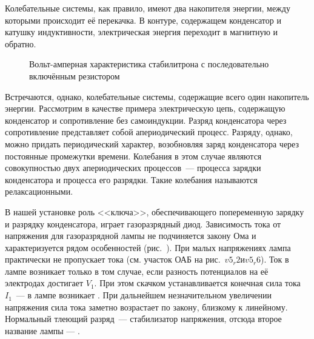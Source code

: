 


Колебательные системы, как правило, имеют два накопителя энергии, между которыми происходит её перекачка. В контуре,
содержащем конденсатор и катушку индуктивности, электрическая энергия переходит в магнитную и обратно.

\begin{figure}[h!]
	\caption{Вольт-амперная характеристика стабилитрона с последовательно включённым резистором}
\end{figure}

Встречаются, однако, колебательные системы, содержащие всего один накопитель энергии. Рассмотрим в качестве примера
электрическую цепь, содержащую конденсатор и сопротивление без самоиндукции. Разряд конденсатора через сопротивление
представляет собой апериодический процесс. Разряду, однако, можно придать периодический характер, возобновляя заряд
конденсатора через постоянные промежутки времени. Колебания в этом случае являются совокупностью двух апериодических
процессов~--- процесса зарядки конденсатора и процесса его разрядки. Такие колебания называются релаксационными.

В нашей установке роль <<ключа>>, обеспечивающего попеременную зарядку и разрядку конденсатора, играет газоразрядный
диод. Зависимость тока от напряжения для газоразрядной лампы не подчиняется закону Ома и характеризуется рядом
особенностей (рис.~). При малых напряжениях лампа практически не пропускает тока (см. участок ОАБ на рис.~$v5_r2 и v5_r6$). 
Ток в лампе возникает только в том случае, если разность потенциалов на её электродах достигает
 $V_1$. При этом скачком устанавливается конечная сила тока $I_1$~--- в лампе возникает
. При дальнейшем незначительном увеличении напряжения сила тока заметно возрастает по
закону, близкому к линейному. Нормальный тлеющий разряд~--- стабилизатор напряжения, отсюда второе название лампы ---
.

